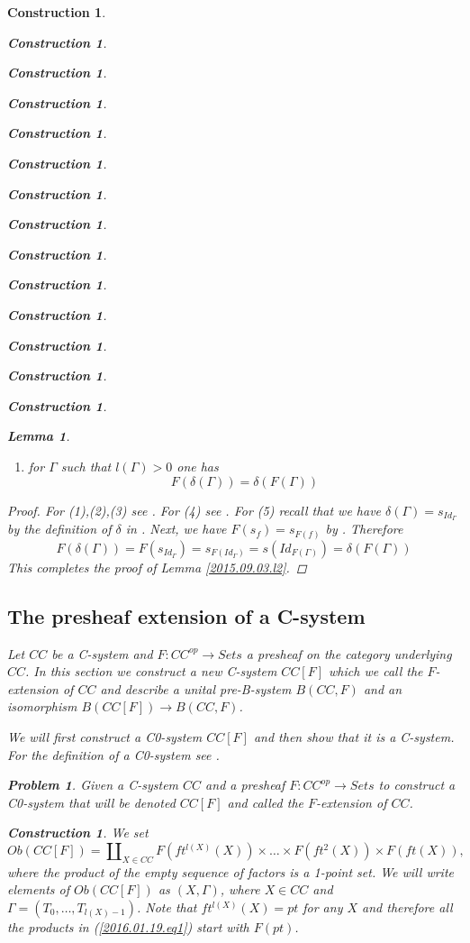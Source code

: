 \documentclass[12pt]{amsart}
\newenvironment{eq}{\begin{equation}}{\end{equation}}
\newtheorem{lemma}[proposition]{Lemma}
\newtheorem{problem}[proposition]{Problem}
\newtheorem{construction}[proposition]{Construction}
\newcommand{\llabel}[1]{\label{#1}}
\newcommand{\sr}{\rightarrow}
\begin{document}
\begin{construction}
\begin{construction}
\begin{construction}
\begin{construction}
\begin{construction}
\begin{construction}
\begin{construction}
\begin{construction}
\begin{construction}
\begin{construction}
\begin{construction}
\begin{construction}
\begin{construction}
\begin{construction}
\begin{lemma}
\begin{enumerate}
%
$$F(f^*(a))=(F(f))^*(F(a))$$
%
\item for $\Gamma$ such that $l(\Gamma)>0$ one has
%
$$F(\delta(\Gamma))=\delta(F(\Gamma))$$
%
\end{enumerate}
\end{lemma}
%
\begin{proof}
For (1),(2),(3) see \cite[Lemma 2.5]{fromunivwithPiI}. For (4) see \cite[Lemma
  2.14]{fromunivwithPiI}. For (5) recall that we have
$\delta(\Gamma)=s_{Id_{\Gamma}}$ by the definition of $\delta$ in
\cite[p.~131]{Csubsystems}. Next, we have $F(s_f)=s_{F(f)}$ by \cite[Lemma
  3.4]{Cfromauniverse}. Therefore
%
$$F(\delta(\Gamma))=F(s_{Id_{\Gamma}})=s_{F(Id_{\Gamma})}=s(Id_{F(\Gamma)})=\delta(F(\Gamma))$$
%
This completes the proof of Lemma \ref{2015.09.03.l2}.  
\end{proof}
%
\subsection{The presheaf extension of a C-system}
\llabel{Fext}
%
Let $CC$ be a C-system and $F:CC^{op}\sr Sets$ a presheaf on the category
underlying $CC$. In this section we construct a new C-system $CC[F]$ which we
call the $F$-extension of $CC$ and describe a unital pre-B-system $B(CC,F)$ and
an isomorphism $B(CC[F])\sr B(CC,F)$.

We will first construct a C0-system $CC[F]$ and then show that it is a
C-system. For the definition of a C0-system see \cite[Definition
  2.1]{Csubsystems}.
%
\begin{problem}\llabel{2016.01.19.prob1}
Given a C-system $CC$ and a presheaf $F:CC^{op}\sr Sets$ to construct a
C0-system that will be denoted $CC[F]$ and called the $F$-extension of $CC$.
\end{problem}
%
\begin{construction}\rm\llabel{2016.01.19.constr1}
We set 
%
\begin{eq}\llabel{2016.01.19.eq1}
Ob(CC[F])=\amalg_{X\in CC} F(ft^{l(X)}(X))\times\dots\times F(ft^2(X))\times
F(ft(X)),
\end{eq}%
%
where the product of the empty sequence of factors is a 1-point set. We will
write elements of $Ob(CC[F])$ as $(X,\Gamma)$, where $X\in CC$ and
$\Gamma=(T_0,\dots,T_{l(X)-1})$. Note that $ft^{l(X)}(X)=pt$ for any $X$ and
therefore all the products in (\ref{2016.01.19.eq1}) start with $F(pt)$.


\end{construction}
\end{construction}
\end{construction}
\end{construction}
\end{construction}
\end{construction}
\end{construction}
\end{construction}
\end{construction}
\end{construction}
\end{construction}
\end{construction}
\end{construction}
\end{construction}
\end{construction}
\end{document}
